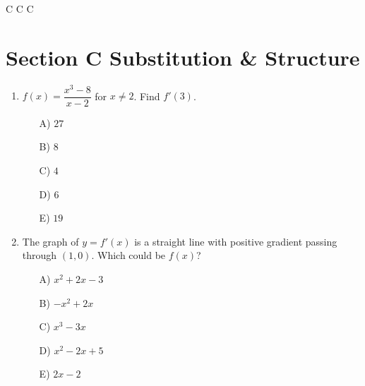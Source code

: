 \documentclass[11pt,a4paper]{article}
\newlength{\ipadheight}
\newcommand{\SpeedSection}[1]{%
  \def\ipadcurrent{#1}%
  \setlength{\ipadheight}{3cm}%
  \ifx\ipadcurrent\ipadB \setlength{\ipadheight}{4.5cm}\fi
  \ifx\ipadcurrent\ipadC \setlength{\ipadheight}{6cm}\fi
  \ifx\ipadcurrent\ipadD \setlength{\ipadheight}{7cm}\fi
  \needspace{5\baselineskip}}
\renewcommand{\ans}[1]{%
  \par\noindent
  \begin{minipage}[t][\ipadheight][t]{\linewidth}%
    \raggedleft\vspace*{\fill}%
    {\fontsize{4}{5}\selectfont\color{black!22}\rotatebox{180}{Ans:~#1}}%
  \end{minipage}%
  \par\vspace{4pt}}
\renewcommand{\method}[1]{}
\renewcommand{\inv}[1]{}
\begin{document}
\SpeedSection{C}
\needspace{12cm}
\section*{Section C \quad Substitution \& Structure}
\begin{enumerate}

\needspace{11cm}
\item $f(x)=\dfrac{x^3-8}{x-2}$ for $x\neq 2$. Find $f'(3)$.
\begin{itemize}
\item[A)] $27$
\item[B)] $8$
\item[C)] $4$
\item[D)] $6$
\item[E)] $19$
\end{itemize}

\ans{B) $8$}
\method{Factor the difference of cubes: $x^3-8=(x-2)(x^2+2x+4)$, so $f(x)=x^2+2x+4$ for $x\neq 2$. Then $f'(x)=2x+2$ and $f'(3)=8$. Decoys: A differentiates numerator and denominator separately ($27/1$); C uses the wrong factor $x^2-2x+4$, giving $2x-2$ and $4$; D uses $x^2+4$ (the error $a^3-b^3=(a-b)(a^2+b^2)$), giving $2x$ and $6$; E gives $f(3)=19$.}
\inv{$f(x)$ is the chord gradient of $y=x^3$ between $2$ and $x$. Show that $f(x)\to 12$ as $x\to2$, and explain why that is the derivative of $x^3$ at $2$. Generalise to $\dfrac{x^n-a^n}{x-a}$.}

\needspace{11cm}
\item The graph of $y=f'(x)$ is a straight line with positive gradient passing through $(1,0)$. Which could be $f(x)$?
\begin{itemize}
\item[A)] $x^2+2x-3$
\item[B)] $-x^2+2x$
\item[C)] $x^3-3x$
\item[D)] $x^2-2x+5$
\item[E)] $2x-2$
\end{itemize}

\ans{D) $x^2-2x+5$}
\method{$f'$ is a straight line $y=m(x-1)$ with $m>0$, so $f$ is a quadratic with $f'(1)=0$ and positive leading coefficient. Only D has $f'=2x-2=2(x-1)$. Decoys: A has $f(1)=0$, confusing a root of $f$ with a root of $f'$ (and $f'(1)=4$); B has $f'=-2(x-1)$, the right line with negative gradient; C has $f'(1)=0$ but $f'=3x^2-3$ is a parabola, not a line; E is $f'$ itself, not $f$.}
\inv{Every $x^2-2x+c$ works. Why can't the graph of $f'$ tell you $c$, and what single extra fact would?}


\end{enumerate}
\end{document}
